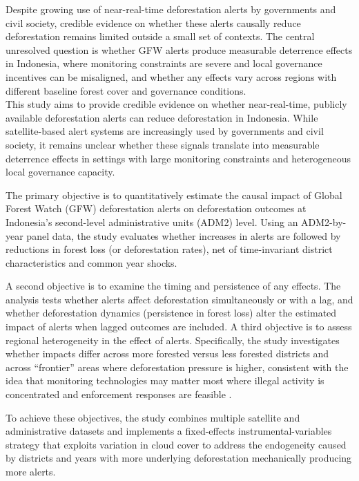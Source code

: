 \documentclass[hidelinks,12pt]{article}
\begin{document}
Despite growing use of near-real-time deforestation alerts by governments and civil society, credible evidence on whether these alerts causally reduce deforestation remains limited outside a small set of contexts. The central unresolved question is whether GFW alerts produce measurable deterrence effects in Indonesia, where monitoring constraints are severe and local governance incentives can be misaligned, and whether any effects vary across regions with different baseline forest cover and governance conditions.\\




This study aims to provide credible evidence on whether near-real-time, publicly available deforestation alerts can reduce deforestation in Indonesia. While satellite-based alert systems are increasingly used by governments and civil society, it remains unclear whether these signals translate into measurable deterrence effects in settings with large monitoring constraints and heterogeneous local governance capacity.

The primary objective is to quantitatively estimate the causal impact of Global Forest Watch (GFW) deforestation alerts on deforestation outcomes at Indonesia’s second-level administrative units (ADM2) level. Using an ADM2-by-year panel data, the study evaluates whether increases in alerts are followed by reductions in forest loss (or deforestation rates), net of time-invariant district characteristics and common year shocks.

A second objective is to examine the timing and persistence of any effects. The analysis tests whether alerts affect deforestation simultaneously or with a lag, and whether deforestation dynamics (persistence in forest loss) alter the estimated impact of alerts when lagged outcomes are included.
A third objective is to assess regional heterogeneity in the effect of alerts. Specifically, the study investigates whether impacts differ across more forested versus less forested districts and across “frontier” areas where deforestation pressure is higher, consistent with the idea that monitoring technologies may matter most where illegal activity is concentrated and enforcement responses are feasible \citep{assuncao2023optimal}.

To achieve these objectives, the study combines multiple satellite and administrative datasets and implements a fixed-effects instrumental-variables strategy that exploits variation in cloud cover to address the endogeneity caused by districts and years with more underlying deforestation mechanically producing more alerts.\\
\end{document}
